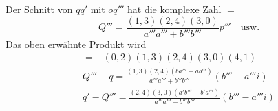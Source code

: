 
Der Schnitt von $qq'$ mit $oq'''$ hat die komplexe Zahl $=$
\[
Q'''=\frac{(1,3)(2,4)(3,0)}{a'''a'''+b'''b'''}p''' \quad\text{usw.}
\]
Das oben erwähnte Produkt wird
\[
\begin{gathered}  =-(0,2)(1,3)(2,4)(3,0)(4,1)\\[9pt] Q'''-q=\frac{(1,3)(2,4)(ba'''-ab''')}{a'''a'''+b'''b'''} (b'''-a'''i)\\[9pt] q'-Q'''=\frac{(2,4)(3,0)(a'b'''-b'a''')}{a'''a'''+b'''b'''} (b'''-a'''i) \end{gathered}
\]
\clearpage
\endgroup
